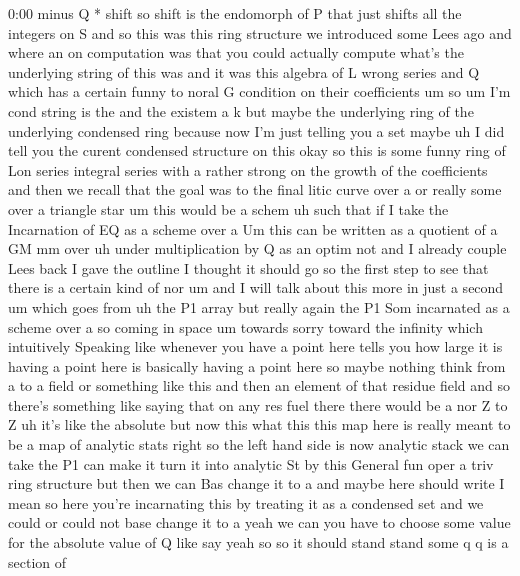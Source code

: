 \begin{unfinished}{0:00}
minus  Q  *
shift  so  shift  is  the  endomorph  of  P
that  just  shifts  all  the  integers  on  S
and  so  this  was  this  ring  structure  we
introduced  some  Lees  ago  and  where  an  on
computation  was  that  you  could  actually
compute  what's  the  underlying  string  of
this  was  and  it  was  this  algebra  of  L
wrong  series  and  Q  which  has  a  certain
funny  to  noral  G  condition  on  their
coefficients
um
so
um  I'm  cond  string
is
the  and  the
existem
a
k  but  maybe  the  underlying  ring  of  the
underlying  condensed  ring  because  now
I'm  just  telling  you  a  set  maybe  uh  I
did  tell  you  the  curent  condensed
structure  on
this  okay  so  this  is  some  funny  ring  of
Lon  series  integral  series  with  a  rather
strong  on  the  growth  of  the
coefficients  and  then  we  recall  that  the
goal
was  to  the  final  litic
curve  over  a  or  really  some  over  a
triangle  star
um  this  would  be  a  schem  uh  such
that  if  I
take  the  Incarnation  of  EQ  as  a  scheme
over
a  Um  this  can  be
written  as  a  quotient  of  a
GM
mm
over
uh  under  multiplication  by  Q  as  an
optim
not
and  I  already  couple  Lees  back  I  gave
the  outline  I  thought  it  should
go
so  the  first  step  to  see  that  there  is
a  certain  kind  of
nor  um  and  I  will  talk  about  this  more
in  just  a  second  um  which  goes
from  uh  the  P1
array  but  really  again  the  P1  Som
incarnated  as  a  scheme  over  a  so  coming
in  space
um  towards
sorry  toward  the  infinity  which
intuitively  Speaking  like  whenever  you
have  a  point
here  tells  you  how  large  it
is  having  a  point  here  is  basically
having  a  point  here  so  maybe  nothing
think  from  a  to  a  field  or  something
like  this  and  then  an  element  of  that
residue  field  and  so  there's  something
like  saying  that  on  any  res  fuel  there
there  would  be  a
nor
Z  to  Z
uh  it's  like  the  absolute  but  now  this
what  this  this  map  here  is  really  meant
to  be  a  map  of  analytic  stats  right  so
the  left  hand  side  is  now  analytic  stack
we  can  take  the  P1  can  make  it  turn  it
into  analytic  St  by  this  General  fun
oper  a  triv  ring  structure  but  then  we
can  Bas  change  it  to
a  and  maybe  here  should  write  I  mean  so
here  you're  incarnating  this  by  treating
it  as  a  condensed
set  and  we  could  or  could  not  base
change  it  to  a  yeah  we  can  you  have  to
choose  some  value  for  the  absolute  value
of  Q  like  say  yeah  so  so  it  should  stand
stand  some  q  q  is  a  section  of

\end{unfinished}

